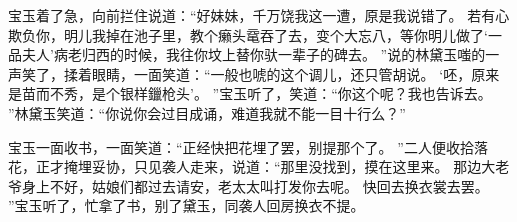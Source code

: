 宝玉着了急，向前拦住说道：“好妹妹，千万饶我这一遭，原是我说错了。
若有心欺负你，明儿我掉在池子里，教个癞头鼋吞了去，变个大忘八，等你明儿做了‘一品夫人’病老归西的时候，我往你坟上替你驮一辈子的碑去。
”说的林黛玉嗤的一声笑了，揉着眼睛，一面笑道：“一般也唬的这个调儿，还只管胡说。
‘呸，原来是苗而不秀，是个银样鑞枪头’。
”宝玉听了，笑道：“你这个呢？我也告诉去。
”林黛玉笑道：“你说你会过目成诵，难道我就不能一目十行么？”\par
宝玉一面收书，一面笑道：“正经快把花埋了罢，别提那个了。
”二人便收拾落花，正才掩埋妥协，只见袭人走来，说道：“那里没找到，摸在这里来。
那边大老爷身上不好，姑娘们都过去请安，老太太叫打发你去呢。
快回去换衣裳去罢。
”宝玉听了，忙拿了书，别了黛玉，同袭人回房换衣不提。
\par


